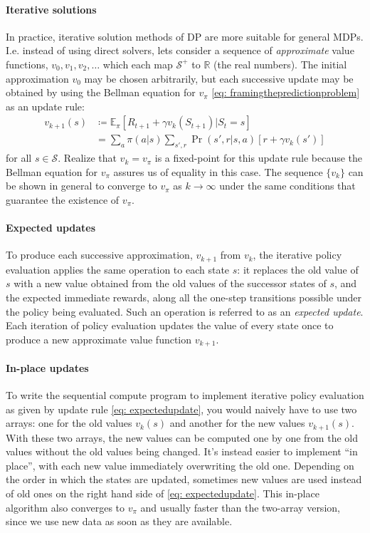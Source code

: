 \documentclass[12pt]{article}
\begin{document}
\paragraph{Iterative solutions}
In practice, iterative solution methods of DP are more suitable for general MDPs. I.e. instead of using direct solvers, lets consider a sequence of \emph{approximate} value functions, $v_0, v_1, v_2, \ldots$ which each map $\mathcal S^+$ to $\mathbb R$ (the real numbers). 
The initial approximation $v_0$ may be chosen arbitrarily, but each successive update may be obtained by using the Bellman equation for $v_\pi$ \ref{eq:   framingthepredictionproblem} as an update rule:
\begin{align}
  \label{eq: expectedupdate}
  v_{k+1}(s) &\coloneqq \mathbb E_\pi \left[R_{t+1} + \gamma v_k(S_{t+1}) | S_t     = s \right] \\
&= \sum_a \pi(a|s) \sum_{s',r} \Pr(s',r|s,a) \left[ r + \gamma v_k(s')\right] \nonumber
\end{align}
for all $s \in \mathcal S$. Realize that $v_k = v_\pi$ is a fixed-point for this update rule because the Bellman equation for $v_\pi$ assures us of equality in this case. The sequence $\{v_k\}$ can be shown in general to converge to $v_\pi$ as $k\to \infty$ under the same conditions that guarantee the existence of $v_\pi$.

\paragraph{Expected updates} To produce each successive approximation, $v_{k+1}$ from $v_k$, the iterative policy evaluation applies the same operation to each state $s$: it replaces the old value of $s$ with a new value obtained from the old values of the successor states of $s$, and the expected immediate rewards, along all the one-step transitions possible under the policy being evaluated. Such an operation is referred to as an \emph{expected update}. Each iteration of policy evaluation updates the value of every state once to produce a new approximate value function $v_{k+1}$.

\paragraph{In-place updates} To write the sequential compute program to implement iterative policy evaluation as given by update rule \ref{eq: expectedupdate}, you would naively have to use two arrays: one for the old values $v_k(s)$ and another for the new values $v_{k+1}(s)$. With these two arrays, the new values can be computed one by one from the old values without the old values being changed. It's instead easier to implement ``in place'', with each new value immediately overwriting the old one. Depending on the order in which the states are updated, sometimes new values are used instead of old ones on the right hand side of \ref{eq: expectedupdate}. This in-place algorithm also converges to $v_\pi$ and usually faster than the two-array version, since we use new data as soon as they are available.
\end{document}
